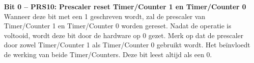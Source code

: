 \textbf{Bit 0 -- PRS10: Prescaler reset Timer/Counter 1 en Timer/Counter 0}\\
Wanneer deze bit met een 1 geschreven wordt, zal de prescaler van Timer/Counter 1 en
Timer/Counter 0 worden gereset. Nadat de operatie is voltooid, wordt deze bit door de
hardware op 0 gezet. Merk op dat de prescaler door zowel Timer/Counter 1 als
Timer/Counter 0 gebruikt wordt. Het beïnvloedt de werking van beide Timer/Counters.
Deze bit leest altijd als een 0.

\endinput